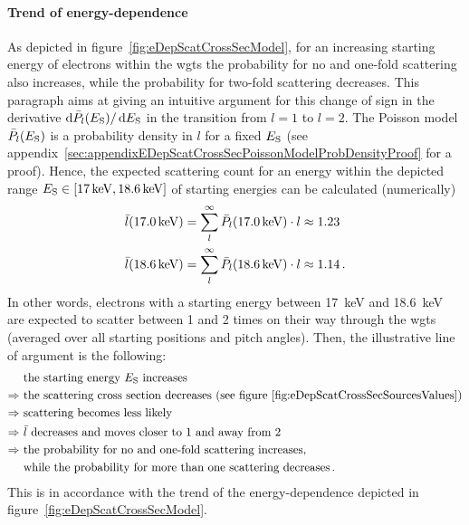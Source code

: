 \paragraph{Trend of energy-dependence}
As depicted in figure~\ref{fig:eDepScatCrossSecModel}, for an increasing starting energy of electrons within the \gls{wgts} the probability for no and one-fold scattering also increases, while the probability for two-fold scattering decreases. This paragraph aims at giving an intuitive argument for this change of sign in the derivative $\mathop{}\!\mathrm{d} \bar{P}_l(E_\mathrm{S}) / \mathop{}\!\mathrm{d} E_\mathrm{S}$ in the transition from $l=1$ to $l=2$. The Poisson model $\bar{P}_l(E_\mathrm{S})$ is a probability density in $l$ for a fixed $E_\mathrm{S}$ (see appendix~\ref{sec:appendixEDepScatCrossSecPoissonModelProbDensityProof} for a proof). Hence, the expected scattering count for an energy within the depicted range $E_\mathrm{S} \in [\SI{17}{keV}, \SI{18.6}{keV}]$ of starting energies can be calculated  (numerically)
\begin{align}
	\bar{l}(\SI{17.0}{keV}) &= 
	\sum_{l}^{\infty} \bar{P}_l(\SI{17.0}{keV}) \cdot l \approx 1.23 \\	
	\bar{l}(\SI{18.6}{keV}) &= 
	\sum_{l}^{\infty} \bar{P}_l(\SI{18.6}{keV}) \cdot l \approx 1.14
	\text{\,.}
\end{align} 
In other words, electrons with a starting energy between \SI{17}{keV} and \SI{18.6}{keV} are expected to scatter between 1 and 2 times on their way through the \gls{wgts} (averaged over all starting positions and pitch angles). Then, the illustrative line of argument is the following: 
\begin{align*}
	&\text{ the starting energy $E_\mathrm{S}$ increases} \\ \Rightarrow
	&\text{ the scattering cross section decreases (see figure~\ref{fig:eDepScatCrossSecSourcesValues})} \\ \Rightarrow
	&\text{ scattering becomes less likely} \\ \Rightarrow
	&\text{ $\bar{l}$ decreases and moves closer to 1 and away from 2} \\ \Rightarrow
	&\text{ the probability for no and one-fold scattering increases,} \\
	&\text{ while the probability for more than one scattering decreases}
	\text{\,.}
\end{align*} 
This is in accordance with the trend of the energy-dependence depicted in figure~\ref{fig:eDepScatCrossSecModel}.
\FloatBarrier

